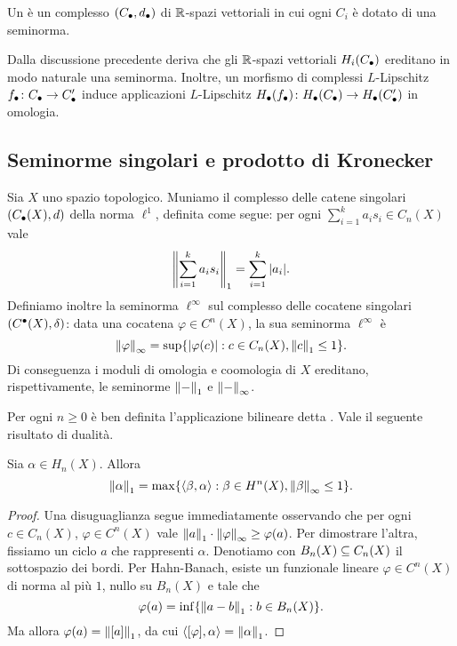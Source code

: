 \begin{definition}
Un  è un complesso $(C_\bullet,d_\bullet)$ di $\mathbb{R}$-spazi vettoriali in cui ogni $C_i$ è dotato di una seminorma.
\end{definition}

Dalla discussione precedente deriva che gli $\mathbb{R}$-spazi vettoriali $H_i(C_\bullet)$ ereditano in modo naturale una seminorma. Inoltre, un morfismo di complessi $L$-Lipschitz $\map{f_\bul}{C_\bul}{C'_\bul}$ induce applicazioni $L$-Lipschitz $\map{H_\bul(f_\bul)}{H_\bul(C_\bul)}{H_\bul(C'_\bul)}$ in omologia.

\subsection{Seminorme singolari e prodotto di Kronecker}

Sia $X$ uno spazio topologico. Muniamo il complesso delle catene singolari $(C_\bullet(X),d)$ della norma $\ell^1$, definita come segue: per ogni $\sum_{i=1}^ka_is_i\in C_n(X)$ vale
\[
\left\lVert \sum_{i=1}^ka_is_i\right\rVert_1=\sum_{i=1}^k|a_i|.
\]
Definiamo inoltre la seminorma $\ell^\infty$ sul complesso delle cocatene singolari $(C^\bullet(X),\delta)$: data una cocatena $\varphi\in C^n(X)$, la sua seminorma $\ell^\infty$ è
\[
\left\lVert \varphi\right\rVert_\infty=\sup\{|\varphi(c)|:c\in C_n(X),\left\lVert c\right\rVert_1\le 1\}.
\]
Di conseguenza i moduli di omologia e coomologia di $X$ ereditano, rispettivamente, le seminorme $\left\lVert -\right\rVert_1$ e $\left\lVert -\right\rVert_\infty$.

Per ogni $n\ge 0$ è ben definita l'applicazione bilineare
detta . Vale il seguente risultato di dualità.

\begin{proposition}
Sia $\alpha\in H_n(X)$. Allora
\[
\left\lVert \alpha\right\rVert_1=\max\{\langle\beta,\alpha\rangle:\beta\in H^n(X),\left\lVert \beta\right\rVert_\infty\le 1\}.
\]
\end{proposition}
\begin{proof}
Una disuguaglianza segue immediatamente osservando che per ogni $c\in C_n(X)$, $\varphi\in C^n(X)$ vale $\left\lVert a\right\rVert_1\cdot\left\lVert \varphi\right\rVert_\infty\ge\varphi(a)$. Per dimostrare l'altra, fissiamo un ciclo $a$ che rappresenti $\alpha$. Denotiamo con $B_n(X)\subseteq C_n(X)$ il sottospazio dei bordi. Per Hahn-Banach, esiste un funzionale lineare $\varphi\in C^n(X)$ di norma al più $1$, nullo su $B_n(X)$ e tale che
\[
\varphi(a)=\inf\{\left\lVert a-b\right\rVert_1:b\in B_n(X)\}.
\]
Ma allora $\varphi(a)=\left\lVert [a]\right\rVert_1$, da cui $\langle[\varphi],\alpha\rangle=\left\lVert \alpha\right\rVert_1$.
\end{proof}